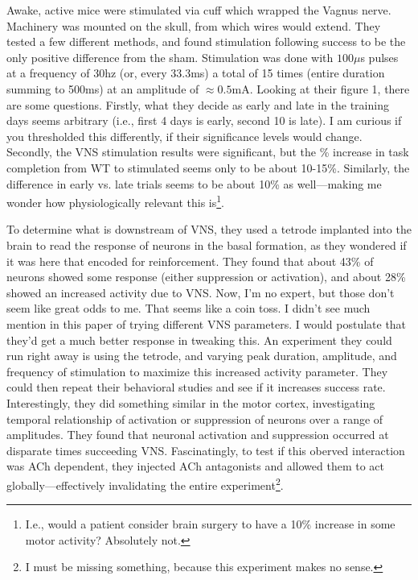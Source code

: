 Awake, active mice were stimulated via cuff which wrapped the Vagnus nerve. Machinery was mounted on the skull, from which wires would extend. They tested a few different methods, and found stimulation following success to be the only positive difference from the sham. Stimulation was done with $100\mu$s pulses at a frequency of 30hz (or, every 33.3ms) a total of 15 times (entire duration summing to 500ms) at an amplitude of $\approx 0.5$mA. Looking at their figure 1, there are some questions. Firstly, what they decide as early and late in the training days seems arbitrary (i.e., first 4 days is early, second 10 is late). I am curious if you thresholded this differently, if their significance levels would change. Secondly, the VNS stimulation results were significant, but the \% increase in task completion from WT to stimulated seems only to be about 10-15\%. Similarly, the difference in early vs. late trials seems to be about 10\% as well---making me wonder how physiologically relevant this is\footnote{I.e., would a patient consider brain surgery to have a 10\% increase in some motor activity? Absolutely not.}.\newline

To determine what is downstream of VNS, they used a tetrode implanted into the brain to read the response of neurons in the basal formation, as they wondered if it was here that encoded for reinforcement. They found that about 43\% of neurons showed some response (either suppression or activation), and about 28\% showed an increased activity due to VNS. Now, I'm no expert, but those don't seem like great odds to me. That seems like a coin toss. I didn't see much mention in this paper of trying different VNS parameters. I would postulate that they'd get a much better response in tweaking this. An experiment they could run right away is using the tetrode, and varying peak duration, amplitude, and frequency of stimulation to maximize this increased activity parameter. They could then repeat their behavioral studies and see if it increases success rate. Interestingly, they did something similar in the motor cortex, investigating temporal relationship of activation or suppression of neurons over a range of amplitudes. They found that neuronal activation and suppression occurred at disparate times succeeding VNS. Fascinatingly, to test if this oberved interaction was ACh dependent, they injected ACh antagonists and allowed them to act globally---effectively invalidating the entire experiment\footnote{I must be missing something, because this experiment makes no sense.}.\newline

